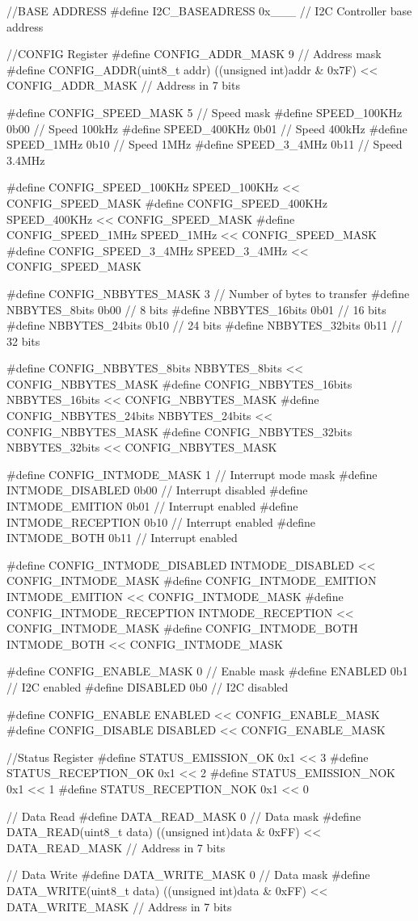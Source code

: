 \begin{Ccode}[caption={Déclaration des constantes}, label={lst:c}]
//BASE ADDRESS
#define I2C_BASEADRESS 0x___ // I2C Controller base address

//CONFIG Register
#define CONFIG_ADDR_MASK 9 // Address mask
#define CONFIG_ADDR(uint8_t addr) ((unsigned int)addr & 0x7F) << CONFIG_ADDR_MASK // Address in 7 bits

#define CONFIG_SPEED_MASK 5 // Speed mask
#define SPEED_100KHz 0b00 // Speed 100kHz
#define SPEED_400KHz 0b01 // Speed 400kHz
#define SPEED_1MHz   0b10 // Speed 1MHz
#define SPEED_3_4MHz 0b11 // Speed 3.4MHz

#define CONFIG_SPEED_100KHz SPEED_100KHz << CONFIG_SPEED_MASK
#define CONFIG_SPEED_400KHz SPEED_400KHz << CONFIG_SPEED_MASK
#define CONFIG_SPEED_1MHz   SPEED_1MHz   << CONFIG_SPEED_MASK
#define CONFIG_SPEED_3_4MHz SPEED_3_4MHz << CONFIG_SPEED_MASK

#define CONFIG_NBBYTES_MASK 3 // Number of bytes to transfer
#define NBBYTES_8bits 0b00 // 8 bits
#define NBBYTES_16bits 0b01 // 16 bits
#define NBBYTES_24bits 0b10 // 24 bits
#define NBBYTES_32bits 0b11 // 32 bits

#define CONFIG_NBBYTES_8bits  NBBYTES_8bits  << CONFIG_NBBYTES_MASK
#define CONFIG_NBBYTES_16bits NBBYTES_16bits << CONFIG_NBBYTES_MASK
#define CONFIG_NBBYTES_24bits NBBYTES_24bits << CONFIG_NBBYTES_MASK
#define CONFIG_NBBYTES_32bits NBBYTES_32bits << CONFIG_NBBYTES_MASK

#define CONFIG_INTMODE_MASK 1       // Interrupt mode mask
#define INTMODE_DISABLED    0b00    // Interrupt disabled
#define INTMODE_EMITION     0b01    // Interrupt enabled
#define INTMODE_RECEPTION   0b10    // Interrupt enabled
#define INTMODE_BOTH        0b11    // Interrupt enabled

#define CONFIG_INTMODE_DISABLED  INTMODE_DISABLED  << CONFIG_INTMODE_MASK
#define CONFIG_INTMODE_EMITION   INTMODE_EMITION   << CONFIG_INTMODE_MASK
#define CONFIG_INTMODE_RECEPTION INTMODE_RECEPTION << CONFIG_INTMODE_MASK
#define CONFIG_INTMODE_BOTH      INTMODE_BOTH      << CONFIG_INTMODE_MASK

#define CONFIG_ENABLE_MASK 0    // Enable mask
#define ENABLED  0b1            // I2C enabled
#define DISABLED 0b0            // I2C disabled

#define CONFIG_ENABLE ENABLED  << CONFIG_ENABLE_MASK
#define CONFIG_DISABLE DISABLED << CONFIG_ENABLE_MASK

//Status Register
#define STATUS_EMISSION_OK      0x1 << 3
#define STATUS_RECEPTION_OK     0x1 << 2
#define STATUS_EMISSION_NOK     0x1 << 1
#define STATUS_RECEPTION_NOK    0x1 << 0

// Data Read
#define DATA_READ_MASK 0 // Data mask
#define DATA_READ(uint8_t data) ((unsigned int)data & 0xFF) << DATA_READ_MASK // Address in 7 bits

// Data Write
#define DATA_WRITE_MASK 0 // Data mask
#define DATA_WRITE(uint8_t data) ((unsigned int)data & 0xFF) << DATA_WRITE_MASK // Address in 7 bits
\end{Ccode}

